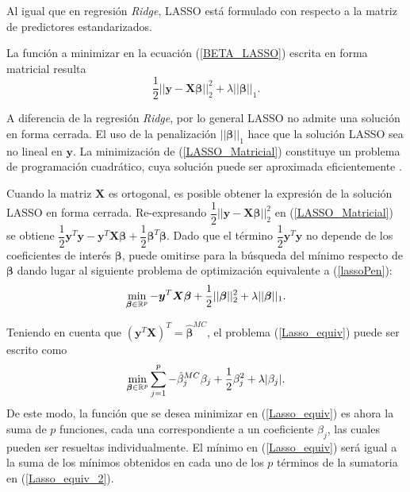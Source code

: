 \documentclass[a4paper,12pt]{report}
\begin{document}
Al igual que en regresión \textit{Ridge}, LASSO está formulado con respecto a la matriz de predictores estandarizados.

La función a minimizar en la ecuación (\ref{BETA_LASSO}) escrita en forma matricial resulta
\begin{equation}
\label{LASSO_Matricial}
\frac{1}{2} ||\boldsymbol{y}-\boldsymbol{X}\boldsymbol{\beta} ||_2^2+\lambda ||\boldsymbol{\beta}||_1.
\end{equation}

A diferencia de la regresión \textit{Ridge}, por lo general LASSO no admite una solución en forma cerrada. El uso de la penalización $||\boldsymbol{\beta}||_1$ hace que la solución LASSO sea no lineal en $\boldsymbol{y}$. La minimización de (\ref{LASSO_Matricial}) constituye un problema de programación cuadrático, cuya solución puede ser aproximada eficientemente \citep{friedman2001elements}.

Cuando la matriz $\boldsymbol{X}$ es ortogonal, es posible obtener la expresión de la solución LASSO en forma cerrada. Re-expresando $\dfrac{1}{2} ||\boldsymbol{y}-\boldsymbol{X}\boldsymbol{\beta} ||_2^2$ en (\ref{LASSO_Matricial}) se obtiene $\dfrac{1}{2}\boldsymbol{y}^T\boldsymbol{y}-\boldsymbol{y}^T\boldsymbol{X}\boldsymbol{\beta}+\dfrac{1}{2}\boldsymbol{\beta}^T\boldsymbol{\beta}$. Dado que el término $\dfrac{1}{2}\boldsymbol{y}^T\boldsymbol{y}$ no depende de los coeficientes de interés $\boldsymbol{\beta}$, puede omitirse para la búsqueda del mínimo respecto de $\boldsymbol{\beta}$ dando lugar al siguiente problema de optimización equivalente a (\ref{lassoPen}):
\begin{equation}
\label{Lasso_equiv}
\operatornamewithlimits{min}\limits_{\boldsymbol{\beta} \in \mathbb{R}^p} -\boldsymbol{y}^T\boldsymbol{X}\boldsymbol{\beta}+\dfrac{1}{2}||\boldsymbol{\beta}||_2^2 +\lambda ||\boldsymbol{\beta}||_1.
\end{equation}

Teniendo en cuenta que $\left(\boldsymbol{y}^T\boldsymbol{X}\right)^T=\boldsymbol{\hat{\beta}}^{MC}$, el problema (\ref{Lasso_equiv}) puede ser escrito como
\begin{equation}
\label{Lasso_equiv_2}
\operatornamewithlimits{min}\limits_{\boldsymbol{\beta} \in \mathbb{R}^p} \sum_{j=1}^p-\hat{\beta}_j^{MC}\beta_j+\frac{1}{2}\beta_j^2+\lambda|\beta_j|.
\end{equation}
De este modo, la función que se desea minimizar en (\ref{Lasso_equiv}) es ahora la suma de $p$ funciones, cada una correspondiente a un coeficiente $\beta_j$, las cuales pueden ser resueltas individualmente. El mínimo en (\ref{Lasso_equiv}) será igual a la suma de los mínimos obtenidos en cada uno de los $p$ términos de la sumatoria en (\ref{Lasso_equiv_2}).
\end{document}
